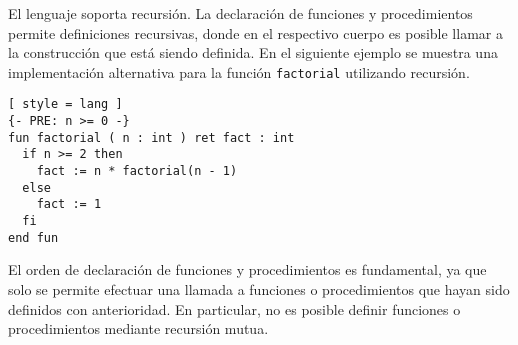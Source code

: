 \iffalse
Observar que en el cuerpo de una función o un procedimiento, es posible declarar variables cuyo alcance abarcarán su totalidad, y especificar un bloque de sentencias que realizará el cálculo deseado.
En la declaración de una función, se utiliza la palabra clave \lstinline[style = lang]{fun} seguida por su nombre.
Se deben detallar los identificadores, y los respectivos tipos para cada uno de sus argumentos.
Con la palabra clave \lstinline[style = lang]{ret} se precisa el nombre, y el tipo de la variable de retorno.
Para finalizar la declaración, se utilizan las palabras claves \lstinline[style = lang]{end fun}.
En la declaración de un procedimiento, se utiliza la palabra clave \lstinline[style = lang]{proc} seguida por su nombre.
Se deben detallar las etiquetas de \textit{entrada/salida}, los identificadores, y los respectivos tipos para cada uno de sus parámetros.
Para finalizar la declaración, se utilizan las palabras claves \lstinline[style = lang]{end proc}.
\fi

El lenguaje soporta recursión.
La declaración de funciones y procedimientos permite definiciones recursivas, donde en el respectivo cuerpo es posible llamar a la construcción que está siendo definida.
En el siguiente ejemplo se muestra una implementación alternativa para la función \lstinline[style = lang]{factorial} utilizando recursión.

\begin{lstlisting}[ style = lang ]
{- PRE: n >= 0 -}
fun factorial ( n : int ) ret fact : int
  if n >= 2 then
    fact := n * factorial(n - 1)
  else
    fact := 1
  fi
end fun
\end{lstlisting}

El orden de declaración de funciones y procedimientos es fundamental, ya que solo se permite efectuar una llamada a funciones o procedimientos que hayan sido definidos con anterioridad.
En particular, no es posible definir funciones o procedimientos mediante recursión mutua.

\iffalse
Un último comentario sobre las funciones y los procedimientos del lenguaje, tiene que ver con el \textit{pasaje por valor} que se emplea en la llamada de las construcciones.
Solo se recibe una copia del valor de las expresiones pasadas como argumento de las construcciones mencionadas.
De todas maneras, el lenguaje impone ciertas restricciones en las declaraciones.
Para una función, sus argumentos no pueden ser modificados.
Para un procedimiento, sus parámetros de lectura no pueden ser modificados, y sus parámetros de escritura no pueden ser consultados.
De alguna manera, estas propiedades permiten abstraer el pasaje de variables utilizado por el lenguaje.
\fi

